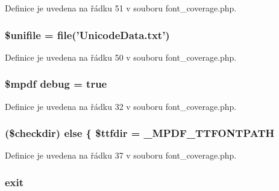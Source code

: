 Definice je uvedena na řádku 51 v souboru font\-\_\-coverage.\-php.

\hypertarget{font__coverage_8php_abaa85dced3638e9abc7f47111f04df8e}{
\subsubsection[{\$unifile}]{\setlength{\rightskip}{0pt plus 5cm}\$unifile = file('Unicode\-Data.\-txt')}}\label{font__coverage_8php_abaa85dced3638e9abc7f47111f04df8e}


Definice je uvedena na řádku 50 v souboru font\-\_\-coverage.\-php.

\hypertarget{font__coverage_8php_a200a436f1833a712239f1ae5bec608db}{
\subsubsection[{debug}]{\setlength{\rightskip}{0pt plus 5cm}\$mpdf debug = true}}\label{font__coverage_8php_a200a436f1833a712239f1ae5bec608db}


Definice je uvedena na řádku 32 v souboru font\-\_\-coverage.\-php.

\hypertarget{font__coverage_8php_a5271a2344cca2dc08862484f40ba9273}{
\subsubsection[{else}]{ (\$checkdir) else \{ \$ttfdir = \-\_\-\-M\-P\-D\-F\-\_\-\-T\-T\-F\-O\-N\-T\-P\-A\-T\-H}}\label{font__coverage_8php_a5271a2344cca2dc08862484f40ba9273}


Definice je uvedena na řádku 37 v souboru font\-\_\-coverage.\-php.

\hypertarget{font__coverage_8php_a6733eb5f605d09eaede9845835d71c4e}{
\subsubsection[{exit}]{\setlength{\rightskip}{0pt plus 5cm}exit}}\label{font__coverage_8php_a6733eb5f605d09eaede9845835d71c4e}


